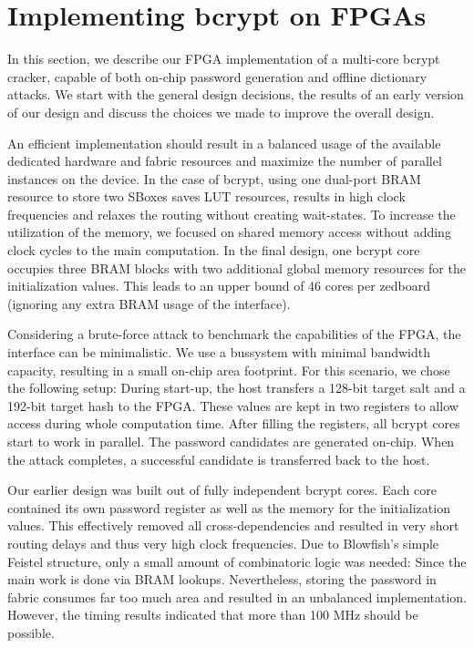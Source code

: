 
\section{Implementing bcrypt on FPGAs}
\label{sec:implementation}

In this section, we describe our FPGA implementation of a multi-core bcrypt
cracker, capable of both on-chip password generation and offline dictionary
attacks. We start with the general design decisions, the results of an early
version of our design and discuss the choices we made to improve the overall
design.

An efficient implementation should result in a balanced usage of the available
dedicated hardware and fabric resources and maximize the number of parallel
instances on the device. In the case of bcrypt, using one dual-port BRAM
resource to store two SBoxes saves LUT resources, results in high clock
frequencies and relaxes the routing without creating wait-states. To increase
the utilization of the memory, we focused on shared memory access without adding
clock cycles to the main computation. In the final design, one bcrypt core
occupies three BRAM blocks with two additional global memory resources for the
initialization values. This leads to an upper bound of 46 cores per zedboard
(ignoring any extra BRAM usage of the interface).

Considering a brute-force attack to benchmark the capabilities of the FPGA, the
interface can be minimalistic. We use a bussystem with minimal bandwidth
capacity, resulting in a small on-chip area footprint. For this scenario, we
chose the following setup: During start-up, the host transfers a 128-bit target
salt and a 192-bit target hash to the FPGA. These values are kept in two
registers to allow access during whole computation time. After filling the
registers, all bcrypt cores start to work in parallel. The password candidates
are generated on-chip. When the attack completes, a successful candidate is
transferred back to the host.

Our earlier design was built out of fully independent bcrypt cores. Each core
contained its own password register as well as the memory for the initialization
values. This effectively removed all cross-dependencies and resulted in very
short routing delays and thus very high clock frequencies. Due to Blowfish's
simple Feistel structure, only a small amount of combinatoric logic was needed:
Since the main work is done via BRAM lookups. Nevertheless, storing the password
in fabric consumes far too much area and resulted in an unbalanced
implementation. However, the timing results indicated that more than 100 MHz
should be possible.

